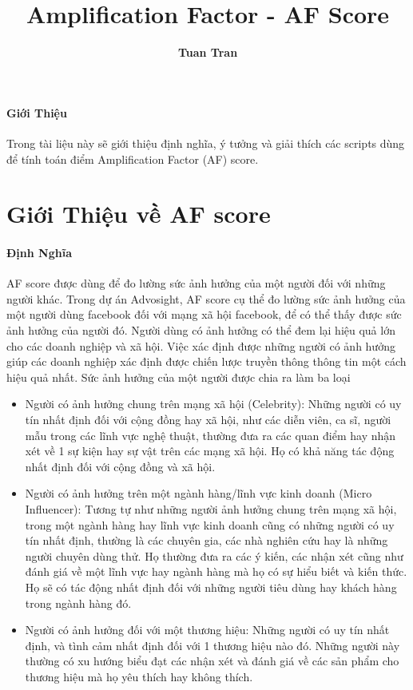 \documentclass[12pt]{article}
\title{Amplification Factor - AF Score}
\author{{\bf Tuan Tran}}
\numberwithin{equation}{section}
\begin{document}
\maketitle
\paragraph{Giới Thiệu} Trong tài liệu này sẽ giới thiệu định nghĩa, ý tưởng và giải thích các scripts dùng để tính toán điểm Amplification Factor (AF) score.

\section{Giới Thiệu về AF score}

\paragraph{Định Nghĩa} AF score được dùng để đo lường sức ảnh hưởng của một người đối với những người khác. Trong dự án Advosight, AF score cụ thể đo lường sức ảnh hưởng của một người dùng facebook đối với mạng xã hội facebook, để có thể thấy được sức ảnh hưởng của người đó. Người dùng có ảnh hưởng có thể đem lại hiệu quả lớn cho các doanh nghiệp và xã hội. Việc xác định được những người có ảnh hưởng giúp các doanh nghiệp xác định được chiến lược truyền thông thông tin một cách hiệu quả nhất. Sức ảnh hưởng của một người được chia ra làm ba loại

\begin{itemize} 

\item{Người có ảnh hưởng chung trên mạng xã hội (Celebrity):} Những người có uy tín nhất định đối với cộng đồng hay xã hội, như các diễn viên, ca sĩ, người mẫu trong các lĩnh vực nghệ thuật, thường đưa ra các quan điểm hay nhận xét về 1 sự kiện hay sự vật trên các mạng xã hội. Họ có khả năng tác động nhất định đối với cộng đồng và xã hội.


\item{Người có ảnh hưởng trên một ngành hàng/lĩnh vực kinh doanh (Micro Influencer):} Tương tự như những người ảnh hưởng chung trên mạng xã hội, trong một ngành hàng hay lĩnh vực kinh doanh cũng có những người có uy tín nhất định, thường là các chuyên gia, các nhà nghiên cứu hay là những người chuyên dùng thử. Họ thường đưa ra các ý kiến, các nhận xét cũng như đánh giá về một lĩnh vực hay ngành hàng mà họ có sự hiểu biết và kiến thức. Họ sẽ có tác động nhất định đối với những người tiêu dùng hay khách hàng trong ngành hàng đó.

\item{Người có ảnh hưởng đối với một thương hiệu:} Những người có uy tín nhất định, và tình cảm nhất định đối với 1 thương hiệu nào đó. Những người này thường có xu hướng biểu đạt các nhận xét và đánh giá về các sản phẩm cho thương hiệu mà họ yêu thích hay không thích.

\end{itemize}
\end{document}

